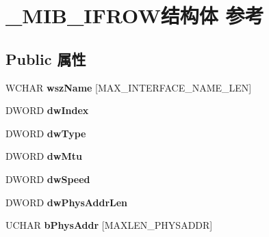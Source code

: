 \hypertarget{struct___m_i_b___i_f_r_o_w}{}\section{\+\_\+\+M\+I\+B\+\_\+\+I\+F\+R\+O\+W结构体 参考}
\label{struct___m_i_b___i_f_r_o_w}
\subsection*{Public 属性}
\begin{DoxyCompactItemize}
\item 
\mbox{\label{struct___m_i_b___i_f_r_o_w_a7376bd220bbda50810109a4df130f84b}} 
W\+C\+H\+AR {\bfseries wsz\+Name} \mbox{[}M\+A\+X\+\_\+\+I\+N\+T\+E\+R\+F\+A\+C\+E\+\_\+\+N\+A\+M\+E\+\_\+\+L\+EN\mbox{]}
\item 
\mbox{\label{struct___m_i_b___i_f_r_o_w_af9a21757863ee8b6d66e7d33f1d7cf07}} 
D\+W\+O\+RD {\bfseries dw\+Index}
\item 
\mbox{\label{struct___m_i_b___i_f_r_o_w_ad670dd71457bf46795e8190665ec4f62}} 
D\+W\+O\+RD {\bfseries dw\+Type}
\item 
\mbox{\label{struct___m_i_b___i_f_r_o_w_a1dff2b35506b1b9bca7bb0c30264908b}} 
D\+W\+O\+RD {\bfseries dw\+Mtu}
\item 
\mbox{\label{struct___m_i_b___i_f_r_o_w_a159751461fa8a9f871affdad6f1ef32f}} 
D\+W\+O\+RD {\bfseries dw\+Speed}
\item 
\mbox{\label{struct___m_i_b___i_f_r_o_w_a862ae6c489e67f1d2d7970529427e81d}} 
D\+W\+O\+RD {\bfseries dw\+Phys\+Addr\+Len}
\item 
\mbox{\label{struct___m_i_b___i_f_r_o_w_a0f23290867b33fb89e1ac67f6251c0f8}} 
U\+C\+H\+AR {\bfseries b\+Phys\+Addr} \mbox{[}M\+A\+X\+L\+E\+N\+\_\+\+P\+H\+Y\+S\+A\+D\+DR\mbox{]}
\item 
\mbox{\label{struct___m_i_b___i_f_r_o_w_a9555b574c7196e54836e6a5d7800df6d}} 

\end{DoxyCompactItemize}
